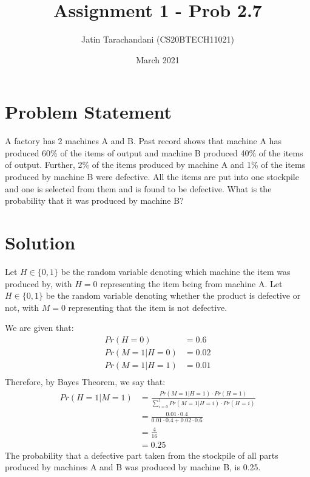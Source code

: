 \documentclass[twocolumn]{article}
\title{Assignment 1 - Prob 2.7}
\author{Jatin Tarachandani (CS20BTECH11021)}
\date{March 2021}
\begin{document}
\maketitle

\section{Problem Statement}
A factory has 2 machines A and B. Past record shows that machine A has produced 60\% of the items of output and machine B produced 40\% of the items of output. Further, 2\% of the items produced by machine A and 1\% of the items produced by machine B were defective. All the items are put into one stockpile and one is selected from them and is found to be defective. What is the probability that it was produced by machine B? 
\section{Solution}
Let $H \in \{0,1\}$ be the random variable denoting which machine the item was produced by, with $H=0$ representing the item being from machine A. Let $H \in \{0,1\}$ be the random variable denoting whether the product is defective or not, with $M=0$ representing that the item is not defective. 

We are given that:
\begin{align*}
Pr(H=0)&=0.6\\
Pr(M=1|H=0)&=0.02\\
Pr(M=1|H=1)&=0.01\\
\end{align*}
Therefore, by Bayes Theorem, we say that:
\begin{align*}
Pr(H=1|M=1)&=\frac{Pr(M=1|H=1)\cdot Pr(H=1)}{\sum_{i=0}^{1} Pr(M=1|H=i)\cdot Pr(H=i)}\\
&=\frac{0.01\cdot 0.4}{0.01\cdot 0.4 + 0.02\cdot 0.6}\\
&=\frac{4}{16}\\
&=0.25
\end{align*}
The probability that a defective part taken from the stockpile of all parts produced by machines A and B was produced by machine B, is 0.25.
\end{document}
